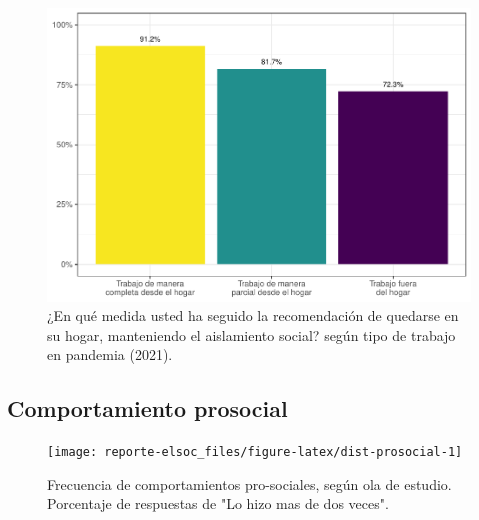 \documentclass[
  12pt,
  openany]{book}
\begin{document}
\begin{figure}

{\centering \includegraphics{reporte-elsoc_files/figure-latex/dist-telet-1} 

}

\caption{¿En qué medida usted ha seguido la recomendación de quedarse en su hogar, manteniendo el aislamiento social? según tipo de trabajo en pandemia (2021).}\label{fig:dist-telet}
\end{figure}

\hypertarget{comportamiento-prosocial}{%
\subsection{Comportamiento prosocial}\label{comportamiento-prosocial}}

\begin{figure}

{\centering \texttt{[image: reporte-elsoc\_files/figure-latex/dist-prosocial-1]} 

}

\caption{Frecuencia de comportamientos pro-sociales, según ola de estudio. Porcentaje de respuestas de "Lo hizo mas de dos veces".}\label{fig:dist-prosocial}
\end{figure}
\end{document}
